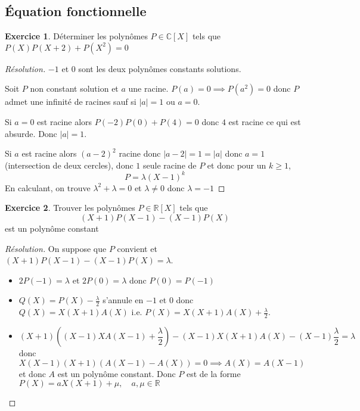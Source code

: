 \documentclass{article}
\theoremstyle{definition}
\newtheorem*{exo}{Exercice}
\begin{document}
\subsection{Équation fonctionnelle}

\begin{exo}
    Déterminer les polynômes $P\in\mathbb C[X]$ tels que $P(X)P(X+2)+P(X^2)=0$
\end{exo}

\begin{proof}[Résolution] $-1$ et $0$ sont les deux polynômes constants solutions.

    Soit $P$ non constant solution et $a$ une racine. $P(a)=0\implies P(a^2)=0$ donc $P$ admet une infinité de racines sauf si $|a|=1$ ou $a=0$.

    Si $a=0$ est racine alors $P(-2)P(0)+P(4)=0$ donc $4$ est racine ce qui est absurde. Donc $|a|=1$.

    Si $a$ est racine alors $(a-2)^2$ racine donc $|a-2|=1=|a|$ donc $a=1$ (intersection de deux cercles), donc $1$ seule racine de $P$ et donc pour un $k\geq 1$, \[
        P=\lambda(X-1)^k
    \]
    En calculant, on trouve $\lambda^2+\lambda=0$ et $\lambda \neq 0$ donc $\lambda = -1$
\end{proof}

\begin{exo}
    Trouver les polynômes $P\in\mathbb R[X]$ tels que \[
        (X+1)P(X-1)-(X-1)P(X)
    \]
    est un polynôme constant
\end{exo}

\begin{proof}[Résolution]
    On suppose que $P$ convient et $(X+1)P(X-1)-(X-1)P(X)=\lambda$. \begin{itemize}
        \item $2P(-1)=\lambda$ et $2P(0)=\lambda$ donc $P(0)=P(-1)$
        \item $Q(X)=P(X)-\frac\lambda 2$ s'annule en $-1$ et $0$ donc $Q(X)=X(X+1)A(X)$ i.e.  $P(X)=X(X+1)A(X)+\frac\lambda 2$.
        \item \[
                (X+1)((X-1)X A(X-1)+\frac\lambda2)-(X-1)X(X+1)A(X)-(X-1)\frac\lambda2=\lambda
            \]
            donc \[
                X(X-1)(X+1)(A(X-1)-A(X))=0 \implies A(X)=A(X-1)
            \]
            et donc $A$ est un polynôme constant. Donc $P$ est de la forme $P(X)=aX(X+1)+\mu, \quad a, \mu\in\mathbb R$
    \end{itemize}
\end{proof}
\end{document}
